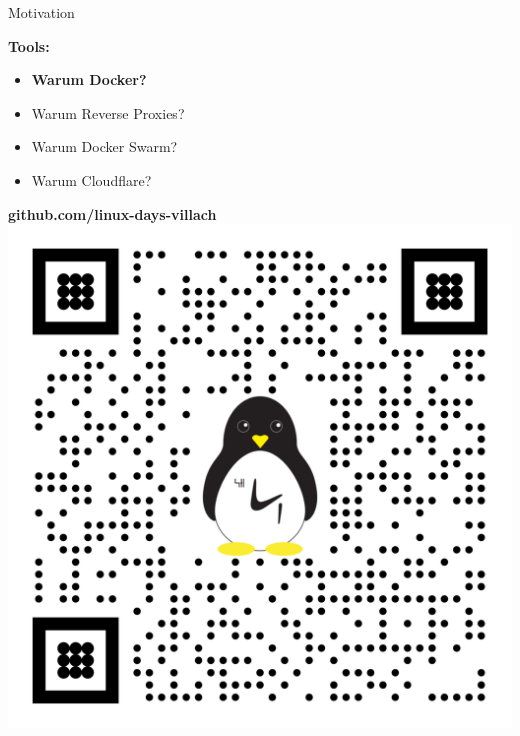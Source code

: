\documentclass[10pt, unknownkeysallowed]{beamer}
\begin{document}
\begin{frame}{Motivation}
\begin{minipage}{.45\textwidth}
    \vspace*{5px}
    \textbf{Tools:}
	\begin{itemize}
	    \item \textbf{Warum Docker?}
		\item Warum Reverse Proxies?
		\item Warum Docker Swarm?
		\item Warum Cloudflare?
	\end{itemize}
	\vspace*{10px}
\end{minipage}
\hfill\vline\hfill
\begin{minipage}{.45\textwidth}
    \vspace*{15px}
    \textbf{github.com/linux-days-villach}
    \includegraphics[width=\linewidth,center]{qr-code.png}
\end{minipage}
\end{frame}
\end{document}
